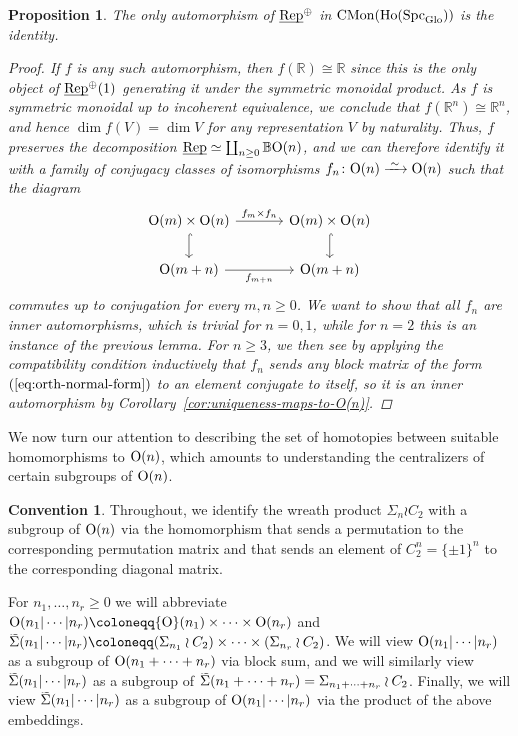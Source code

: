 \documentclass[reqno]{memo-l}
\theoremstyle{mythm}
\newtheorem{prop}[thm]{Proposition}
\theoremstyle{definition}
\newtheorem{convention}[thm]{Convention}
\numberwithin{equation}{section}
\newcommand{\R} {{\mathbb{R}}}
\DeclareMathOperator{\Spc}{Spc}
\DeclareMathOperator{\CMon}{CMon}
\renewcommand{\O}{{\textup{O}}}
\newcommand{\Sig}{\smash{\widetilde{\vphantom{t}\smash{\Sigma}}}}
\newcommand{\Glo}{\textup{Glo}}
\newcommand{\BGcat}[1]{\mathbb B{#1}}
\newcommand{\ulhelper}[2]{\underline{\setbox0=\hbox{$#1#2$}\dp0=0.4pt \box0\relax}}
\newcommand{\ul}[1]{{\mathpalette\ulhelper{#1}}\hbox{\rule[-2pt]{0pt}{0pt}}}
\newcommand{\iso}{\xrightarrow{\;\smash{\raisebox{-0.25ex}{\ensuremath{\scriptstyle\sim}}}\;}}
\newcommand{\Vect}{\textup{Rep}}
\begin{document}
\begin{prop}\label{prop:Aut-h-Vect}
    The only automorphism of $\ul\Vect^\oplus$ in $\CMon(\textup{Ho}(\Spc_\Glo))$ is the identity.
    \begin{proof}
        If $f$ is any such automorphism, then $f(\R)\cong\R$ since this is the only object of $\ul\Vect^\oplus(1)$ generating it under the symmetric monoidal product. As $f$ is symmetric monoidal up to incoherent equivalence, we conclude that $f(\R^n)\cong\R^n$, and hence $\dim f(V)= \dim V$ for any representation $V$ by naturality. Thus, $f$ preserves the decomposition $\ul\Vect\simeq\coprod_{n\ge0}\BGcat{\O(n)}$, and we can therefore identify it with a family of conjugacy classes of isomorphisms $f_n\colon\O(n)\iso\O(n)$ such that the diagram
        \[
            \begin{tikzcd}
                \O(m)\times\O(n)\arrow[r,"f_m\times f_n"]\arrow[d,hook] &[1em] \O(m)\times\O(n)\arrow[d,hook]\\
                \O(m+n)\arrow[r,"f_{m+n}"'] & \O(m+n)
            \end{tikzcd}
        \]
        commutes up to conjugation for every $m,n\ge0$. We want to show that all $f_n$ are inner automorphisms, which is trivial for $n=0,1$, while for $n=2$ this is an instance of the previous lemma. For $n\ge3$, we then see by applying the compatibility condition inductively that $f_n$ sends any block matrix of the form $(\ref{eq:orth-normal-form})$ to an element conjugate to itself, so it is an inner automorphism by Corollary~\ref{cor:uniqueness-maps-to-O(n)}.
    \end{proof}
\end{prop}

We now turn our attention to describing the set of homotopies between suitable homomorphisms to $\O(n)$, which amounts to understanding the centralizers of certain subgroups of $\O(n)$.

\begin{convention}
    Throughout, we identify the wreath product $\Sigma_n\wr C_2$ with a subgroup of $\O(n)$ via the homomorphism that sends a permutation to the corresponding permutation matrix and that sends an element of $C_2^n=\{\pm1\}^n$ to the corresponding diagonal matrix.

    For $n_1,\dots,n_r\ge0$ we will abbreviate $\O(n_1|\cdots|n_r)\coloneqq\O(n_1)\times\cdots\times\O(n_r)$ and $\Sig(n_1|\cdots|n_r)\coloneqq(\Sigma_{n_1}\wr C_2)\times\cdots\times(\Sigma_{n_r}\wr C_2)$. We will view $\O(n_1|\cdots|n_r)$ as a subgroup of $\O(n_1+\cdots+n_r)$ via block sum, and we will similarly view $\Sig(n_1|\cdots|n_r)$ as a subgroup of $\Sig(n_1+\cdots+n_r)=\Sigma_{n_1+\cdots+n_r}\wr C_2$. Finally, we will view $\Sig(n_1|\cdots|n_r)$ as a subgroup of $\O(n_1|\cdots|n_r)$ via the product of the above embeddings.
\end{convention}
\end{document}
